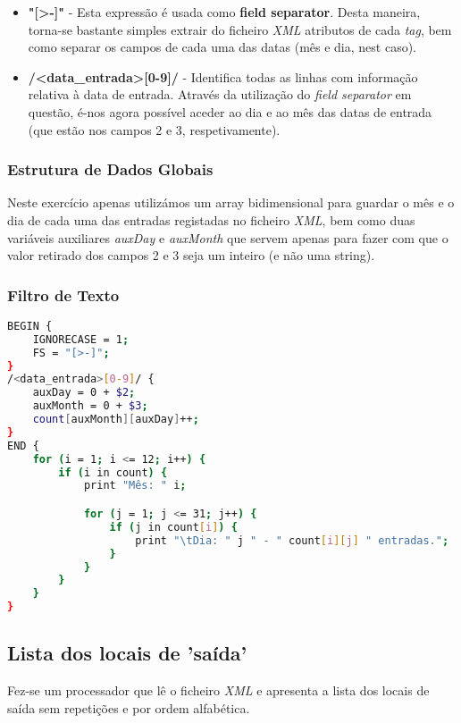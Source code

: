 \documentclass{article}
\begin{document}
\begin{itemize}
    \item \textbf{"[\textgreater-]"} - Esta expressão é usada como \textbf{field separator}. Desta maneira, torna-se bastante simples extrair do ficheiro \emph{XML} atributos de cada \emph{tag}, bem como separar os campos de cada uma das datas (mês e dia, nest caso).
    \item \textbf{/\textless data\_entrada\textgreater[0-9]/} - Identifica todas as linhas com informação relativa à data de entrada. Através da utilização do \emph{field separator} em questão, é-nos agora possível aceder ao dia e ao mês das datas de entrada (que estão nos campos 2 e 3, respetivamente).
\end{itemize}

\subsubsection{Estrutura de Dados Globais}

Neste exercício apenas utilizámos um array bidimensional para guardar o mês e o dia de cada uma das entradas registadas no ficheiro \emph{XML}, bem como duas variáveis auxiliares \emph{auxDay} e \emph{auxMonth} que servem apenas para fazer com que o valor retirado dos campos 2 e 3 seja um inteiro (e não uma string).

\subsubsection{Filtro de Texto}

\begin{lstlisting}[language=bash]
BEGIN {
	IGNORECASE = 1;
	FS = "[>-]";
}
/<data_entrada>[0-9]/ {
	auxDay = 0 + $2;
	auxMonth = 0 + $3;
	count[auxMonth][auxDay]++;
}
END {
	for (i = 1; i <= 12; i++) {
		if (i in count) {
			print "Mês: " i;

			for (j = 1; j <= 31; j++) {
				if (j in count[i]) {
					print "\tDia: " j " - " count[i][j] " entradas.";
				}
			} 
		}
	}
}
\end{lstlisting}


\subsection{Lista dos locais de 'saída'}

Fez-se um processador que lê o ficheiro \emph{XML} e apresenta a lista dos locais de saída sem repetições e por ordem alfabética.
\end{document}
